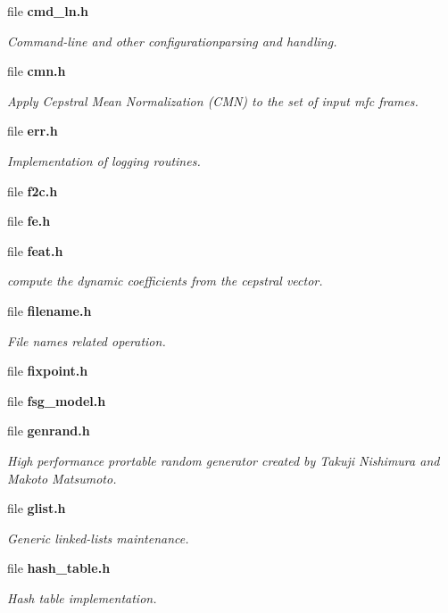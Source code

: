 \begin{DoxyCompactItemize}
file {\bf cmd\+\_\+ln.\+h}
\begin{DoxyCompactList}\small\item\em Command-\/line and other configurationparsing and handling. \end{DoxyCompactList}\item 
file {\bf cmn.\+h}
\begin{DoxyCompactList}\small\item\em Apply Cepstral Mean Normalization (C\+M\+N) to the set of input mfc frames. \end{DoxyCompactList}\item 
file {\bf err.\+h}
\begin{DoxyCompactList}\small\item\em Implementation of logging routines. \end{DoxyCompactList}\item 
file {\bfseries f2c.\+h}
\item 
file {\bfseries fe.\+h}
\item 
file {\bf feat.\+h}
\begin{DoxyCompactList}\small\item\em compute the dynamic coefficients from the cepstral vector. \end{DoxyCompactList}\item 
file {\bf filename.\+h}
\begin{DoxyCompactList}\small\item\em File names related operation. \end{DoxyCompactList}\item 
file {\bfseries fixpoint.\+h}
\item 
file {\bfseries fsg\+\_\+model.\+h}
\item 
file {\bf genrand.\+h}
\begin{DoxyCompactList}\small\item\em High performance prortable random generator created by Takuji Nishimura and Makoto Matsumoto. \end{DoxyCompactList}\item 
file {\bf glist.\+h}
\begin{DoxyCompactList}\small\item\em Generic linked-\/lists maintenance. \end{DoxyCompactList}\item 
file {\bf hash\+\_\+table.\+h}
\begin{DoxyCompactList}\small\item\em Hash table implementation. \end{DoxyCompactList}\item 

\end{DoxyCompactItemize}

